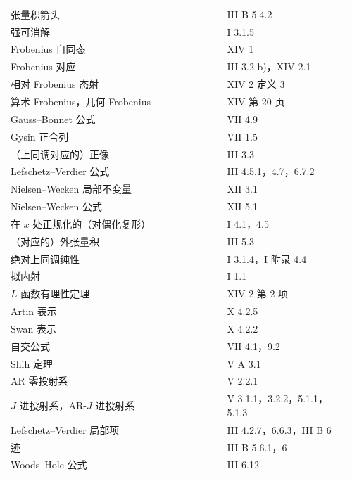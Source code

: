 \begin{longtable}{@{}p{0.61\linewidth}p{0.35\linewidth}@{}}
张量积箭头 & III B 5.4.2\\
强可消解 & I 3.1.5\\
Frobenius 自同态 & XIV 1\\
Frobenius 对应 & III 3.2 b)，XIV 2.1\\
相对 Frobenius 态射 & XIV 2 定义 3\\
算术 Frobenius，几何 Frobenius & XIV 第 20 页\\
Gauss--Bonnet 公式 & VII 4.9\\
Gysin 正合列 & VII 1.5\\
（上同调对应的）正像 & III 3.3\\
Lefschetz--Verdier 公式 & III 4.5.1，4.7，6.7.2\\
Nielsen--Wecken 局部不变量 & XII 3.1\\
Nielsen--Wecken 公式 & XII 5.1\\
在 $x$ 处正规化的（对偶化复形） & I 4.1，4.5\\
（对应的）外张量积 & III 5.3\\
绝对上同调纯性 & I 3.1.4，I 附录 4.4\\
拟内射 & I 1.1\\
$L$ 函数有理性定理 & XIV 2 第 2 项\\
Artin 表示 & X 4.2.5\\
Swan 表示 & X 4.2.2\\
自交公式 & VII 4.1，9.2\\
Shih 定理 & V A 3.1\\
AR 零投射系 & V 2.2.1\\
$J$ 进投射系，AR-$J$ 进投射系 & V 3.1.1，3.2.2，5.1.1，5.1.3\\
Lefschetz--Verdier 局部项 & III 4.2.7，6.6.3，III B 6\\
迹 & III B 5.6.1，6\\
Woods--Hole 公式 & III 6.12
\end{longtable}

